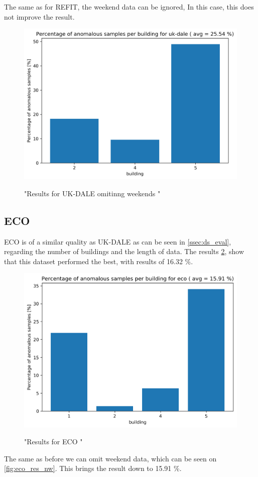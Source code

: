 The same as for REFIT, the weekend data can be ignored,
In this case, this does not improve the result. 

\begin{figure}[H]
	\centering
	\caption{"Results for UK-DALE omitinng weekends  "}
	\includegraphics[width=.7\textwidth]{Figures/EC/ukdale_nw_res.png}
	\label{fig:ukdale_res_nw}
\end{figure}

\subsection{ECO}

ECO is of a similar quality as UK-DALE as can be seen in \ref{ssec:ds_eval}, regarding the number of buildings and the length of data.
The results \ref{fig:eco_res}, show that this dataset performed the best, with results of 16.32 \%.

\begin{figure}[H]
	\centering
	\caption{"Results for ECO "}
	\includegraphics[width=.7\textwidth]{Figures/EC/eco_res_nw_1.png}
	\label{fig:eco_res}
\end{figure}

The same as before we can omit weekend data, which can be seen on \ref{fig:eco_res_nw}. This brings the result down to 15.91 \%. 

